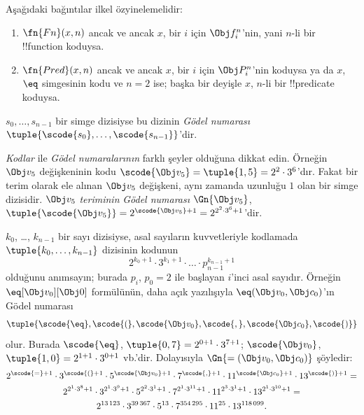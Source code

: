 \begin{prop}
Aşağıdaki bağıntılar ilkel özyinelemelidir:
\begin{enumerate}
\item $\fn{Fn}(x, n)$ ancak ve ancak $x$, bir $i$ için $\Obj f^n_i$'nin,
  yani $n$-li bir !!{function} koduysa.
\item $\fn{Pred}(x, n)$ ancak ve ancak $x$, bir $i$ için $\Obj P^n_i$'nin
  koduysa ya da $x$, $\eq$ simgesinin kodu ve $n = 2$ ise; başka bir
  deyişle $x$, $n$-li bir !!{predicate} koduysa.
\end{enumerate}
\end{prop}

\begin{defn}
$s_0, \dots, s_{n-1}$ bir simge dizisiyse bu dizinin \emph{Gödel numarası}
$\tuple{\scode{s_0}, \dots, \scode{s_{n-1}}}$'dir.
\end{defn}

\begin{explain}
\emph{Kodlar} ile \emph{Gödel numaralarının} farklı şeyler olduğuna dikkat
edin. Örneğin $\Obj v_5$ değişkeninin kodu $\scode{\Obj v_5} = \tuple{1, 5}
= 2^2\cdot 3^6$'dır. Fakat bir terim olarak ele alınan $\Obj v_5$ değişkeni,
aynı zamanda uzunluğu $1$ olan bir simge dizisidir. $\Obj v_5$
\emph{teriminin} \emph{Gödel numarası} $\Gn{\Obj v_5}$,
$\tuple{\scode{\Obj v_5}} = 2^{\scode{\Obj v_5} + 1} =
2^{2^2\cdot 3^6 + 1}$'dir.
\end{explain}

\begin{ex}
$k_0$, \dots, $k_{n-1}$ bir sayı dizisiyse, asal sayıların kuvvetleriyle
kodlamada $\tuple{k_0, \dots, k_{n-1}}$ dizisinin kodunun
\[
2^{k_0+1}\cdot3^{k_1+1}\cdot \dots \cdot p_{n-1}^{k_{n-1}+1}
\]
olduğunu anımsayın; burada $p_i$, $p_0=2$ ile başlayan $i$'inci asal
sayıdır. Örneğin $\eq[\Obj v_0][\Obj 0]$ formülünün, daha açık yazılışıyla
${\eq}(\Obj v_0,\Obj c_0)$'ın Gödel numarası
\[
\tuple{\scode{\eq},\scode{(},\scode{\Obj v_0},\scode{,}, \scode{\Obj
    c_0},\scode{)}}
\]
olur. Burada $\scode{\eq}$, $\tuple{0,7} = 2^{0+1}\cdot 3^{7+1}$;
$\scode{\Obj v_0}$, $\tuple{1,0} = 2^{1+1}\cdot3^{0+1}$ vb.'dir.
Dolayısıyla $\Gn{=(\Obj v_0,\Obj c_0)}$ şöyledir:
\begin{multline*}
2^{\scode{=} + 1}\cdot 3^{\scode{(}+1}\cdot 5^{\scode{\Obj v_0}+1}
\cdot 7^{\scode{,} + 1} \cdot 11^{\scode{\Obj c_0}+1} \cdot
13^{\scode{)}+1} = \\
2^{2^1\cdot 3^8 + 1}\cdot 3^{2^1\cdot 3^9+1}\cdot 5^{2^2\cdot 3^1+1}
\cdot 7^{2^1\cdot 3^{11} + 1} \cdot 11^{2^3\cdot3^1+1} \cdot
13^{2^1\cdot3^{10}+1} = \\
2^{13\,123}\cdot 3^{39\,367}\cdot 5^{13}\cdot 7^{354\,295}\cdot11^{25}\cdot13^{118\,099}.
\end{multline*}
\end{ex}

